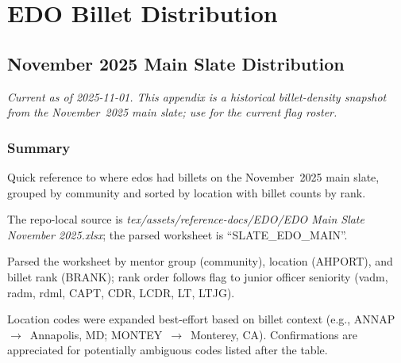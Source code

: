 \documentclass[../main.tex]{subfiles}
\begin{document}
\chapter{EDO Billet Distribution}

\section{November 2025 Main Slate Distribution}\label{app:edo-billet-distribution}
\noindent\textit{Current as of 2025-11-01. This appendix is a historical billet-density snapshot from the November~2025 main slate; use \App{\ref{app:edo-flags}} for the current flag roster.}

\subsection{Summary}
\begin{description}[style=nextline, labelsep=0.5em, font=\bfseries]
  \item[\textbf{Purpose.}] Quick reference to where \acp{edo} had billets on the November~2025 main slate, grouped by community and sorted by location with billet counts by rank.
  \item[\textbf{Source workbook.}] The repo-local source is \emph{tex/assets/reference-docs/EDO/EDO Main Slate November 2025.xlsx}; the parsed worksheet is ``SLATE\_EDO\_MAIN''.
  \item[\textbf{Method.}] Parsed the worksheet by mentor group (community), location (AHPORT), and billet rank (BRANK); rank order follows flag to junior officer seniority (\acs{vadm}, \acs{radm}, \acs{rdml}, CAPT, CDR, LCDR, LT, LTJG).
  \item[\textbf{Location expansions.}] Location codes were expanded best-effort based on billet context (e.g., ANNAP~$\rightarrow$~Annapolis, MD; MONTEY~$\rightarrow$~Monterey, CA). Confirmations are appreciated for potentially ambiguous codes listed after the table.
\end{description}
\end{document}
